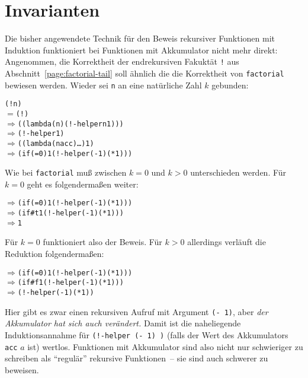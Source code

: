 

\section{Invarianten}
\label{sec:invarianten}

Die bisher angewendete Technik für den Beweis rekursiver Funktionen
mit Induktion funktioniert bei Funktionen mit Akkumulator nicht mehr
direkt: Angenommen, die Korrektheit der endrekursiven Fakuktät
\texttt{!} aus Abschnitt~\ref{page:factorial-tail} soll ähnlich die
die Korrektheit von \texttt{factorial} bewiesen werden.  Wieder sei
\texttt{n} an eine natürliche Zahl $k$ gebunden:
%
\begin{alltt}
(! n)
\(=\) (! )
\(\Longrightarrow\) ((lambda (n) (!-helper n 1)) )
\(\Longrightarrow\) (!-helper  1)
\(\Longrightarrow\) ((lambda (n acc) \ldots)  1)
\(\Longrightarrow\) (if (=  0) 1 (!-helper (-  1) (* 1 )))
\end{alltt}
%
Wie bei \texttt{factorial} muß zwischen $k=0$ und $k>0$ unterschieden
werden.  Für $k=0$ geht es folgendermaßen weiter:
%
\begin{alltt}
\(\Longrightarrow\) (if (=  0) 1 (!-helper (-  1) (* 1 )))
\(\Longrightarrow\) (if #t 1 (!-helper (-  1) (* 1 )))
\(\Longrightarrow\) 1
\end{alltt}
%
Für $k=0$ funktioniert also der Beweis.  Für $k>0$ allerdings verläuft
die Reduktion folgendermaßen:
%
\begin{alltt}
\(\Longrightarrow\) (if (=  0) 1 (!-helper (-  1) (* 1 )))
\(\Longrightarrow\) (if #f 1 (!-helper (-  1) (* 1 )))
\(\Longrightarrow\) (!-helper (-  1) (* 1 ))
\end{alltt}
%
Hier gibt es zwar einen rekursiven Aufruf mit Argument \texttt{(-
   1)}, aber \emph{der Akkumulator hat sich auch verändert.}
Damit ist die naheliegende Induktionsannahme für \texttt{(!-helper (-
   1) )} (falls der Wert des Akkumulators
\texttt{acc} $a$ ist) wertlos.  Funktionen mit Akkumulator sind also
nicht nur schwieriger zu schreiben als "`regulär"' rekursive
Funktionen~-- sie sind auch schwerer zu beweisen.

